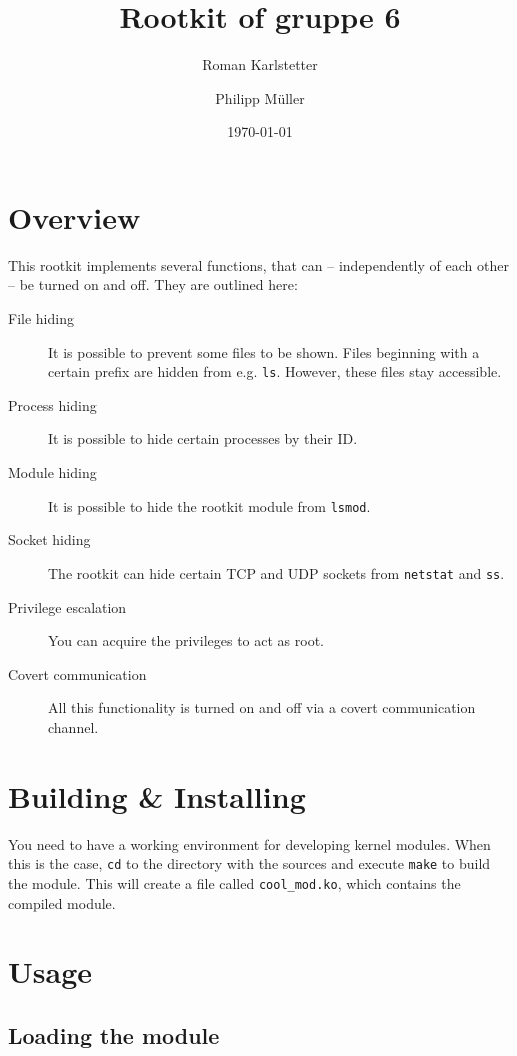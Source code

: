 \documentclass[10pt, letterpaper]{article}
\title{Rootkit of gruppe 6}
\author{Roman Karlstetter \and Philipp M\"uller}
\date{\today}
\begin{document}
\maketitle

\section{Overview}

This rootkit implements several functions, that can -- independently of each other -- be turned on and off. They are outlined here:

\begin{description}
\item [File hiding] It is possible to prevent some files to be shown. Files beginning with a certain prefix are hidden from e.g. \texttt{ls}. However, these files stay accessible.
\item [Process hiding] It is possible to hide certain processes by their ID.
\item [Module hiding] It is possible to hide the rootkit module from \texttt{lsmod}.
\item [Socket hiding] The rootkit can hide certain TCP and UDP sockets from \texttt{netstat} and \texttt{ss}.
\item [Privilege escalation] You can acquire the privileges to act as root.
\item [Covert communication] All this functionality is turned on and off via a covert communication channel.
\end{description}

\section{Building \& Installing}
You need to have a working environment for developing kernel modules. When this is the case, \texttt{cd} to the directory with the sources and execute \texttt{make} to build the module. This will create a file called \texttt{cool\_mod.ko}, which contains the compiled module.

\section{Usage}

\subsection{Loading the module}
\end{document}
